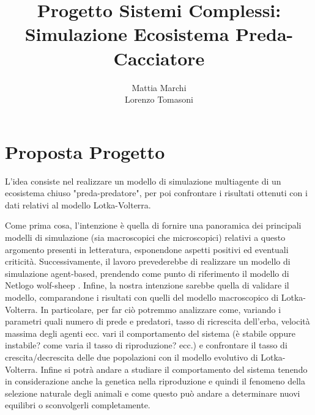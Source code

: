 \documentclass{article}
\title{Progetto Sistemi Complessi: Simulazione Ecosistema Preda-Cacciatore}
\author{Mattia Marchi\\
Lorenzo Tomasoni}
\date{}
\begin{document}
\maketitle

\newpage

\section{Proposta Progetto}

L'idea consiste nel realizzare un modello di simulazione multiagente di un ecosistema chiuso "preda-predatore", per poi confrontare i risultati ottenuti con i dati relativi al modello Lotka-Volterra. 

Come prima cosa, l'intenzione è quella di fornire una panoramica dei principali modelli di simulazione (sia macroscopici che microscopici) relativi a questo argomento presenti in letteratura, esponendone aspetti positivi ed eventuali criticità. Successivamente, il lavoro prevederebbe di realizzare un modello di simulazione agent-based, prendendo come punto di riferimento il modello di Netlogo wolf-sheep \cite{NetLogoModel}. Infine, la nostra intenzione sarebbe quella di validare il modello, comparandone i risultati con quelli del modello macroscopico di  Lotka-Volterra. In particolare, per far ciò potremmo analizzare come, variando i parametri quali numero di prede e predatori, tasso di ricrescita dell'erba, velocità massima degli agenti ecc. vari il comportamento del sistema (è stabile oppure instabile? come varia il tasso di riproduzione? ecc.) e confrontare il tasso di crescita/decrescita delle due popolazioni con il modello evolutivo di Lotka-Volterra. Infine si potrà andare a studiare il comportamento del sistema tenendo in considerazione anche la genetica nella riproduzione e quindi il fenomeno della selezione naturale degli animali e come questo può andare a determinare nuovi equilibri o sconvolgerli completamente.

\vspace{0.5cm}
\end{document}
